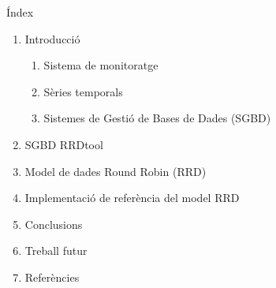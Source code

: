 \begin{frame}
  \titlepage
\end{frame}


\begin{frame}{Índex}
  \begin{enumerate}
  
  \item Introducció
    \begin{enumerate}
    \item Sistema de monitoratge
    \item Sèries temporals
    \item Sistemes de Gestió de Bases de Dades (SGBD)
    \end{enumerate}
    
  \item SGBD RRDtool 
    
  \item Model de dades Round Robin (RRD)
    
  \item Implementació de referència del model RRD
    
  \item Conclusions
    
  \item Treball futur
    
  \item Referències
\end{enumerate}
\end{frame}




